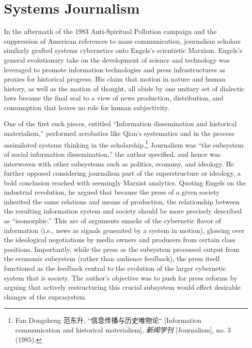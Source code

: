 \documentclass{tufte-handout}
\begin{document}
\hypertarget{systems-journalism}{%
\section{Systems Journalism}\label{systems-journalism}}

\begin{CJK*}{UTF8}{gbsn} 

In the aftermath of the 1983 Anti-Spiritual Pollution campaign and the
suppression of American references to mass communication, journalism
scholars similarly grafted systems cybernetics onto Engels's scientistic
Marxism. Engels's general evolutionary take on the development of
science and technology was leveraged to promote information technologies
and press infrastructures as proxies for historical progress. His claim
that motion in nature and human history, as well as the motion of
thought, all abide by one unitary set of dialectic laws became the final
seal to a view of news production, distribution, and consumption that
leaves no role for human subjectivity.

One of the first such pieces, entitled ``Information dissemination and
historical materialism,'' performed acrobatics like Qian's systematics
and in the process assimilated systems thinking in the
scholarship.\footnote{Fan Dongsheng 范东升, ``信息传播与历史唯物论``
  {[}Information communication and historical materialism{]},
  \emph{新闻学刊} {[}Journalism{]}, no. 3 (1985).} Journalism was ``the
subsystem of social information dissemination,'' the author specified,
and hence was interwoven with other subsystems such as politics,
economy, and ideology. He further opposed considering journalism part of
the superstructure or ideology, a bold conclusion reached with seemingly
Marxist analytics. Quoting Engels on the industrial revolution, he
argued that because the press of a given society inherited the same
relations and means of production, the relationship between the
resulting information system and society should be more precisely
described as ``isomorphic.'' This arc of arguments smacks of the
cybernetic flavor of information (i.e., news as signals generated by a
system in motion), glossing over the ideological negotiations by media
owners and producers from certain class positions. Importantly, while
the press as the subsystem processed output from the economic subsystem
(rather than audience feedback), the press itself functioned as the
feedback central to the evolution of the larger cybernetic system that
is society. The author's objective was to push for press reforms by
arguing that actively restructuring this crucial subsystem would effect
desirable changes of the suprasystem.


\end{CJK*}
\end{document}

